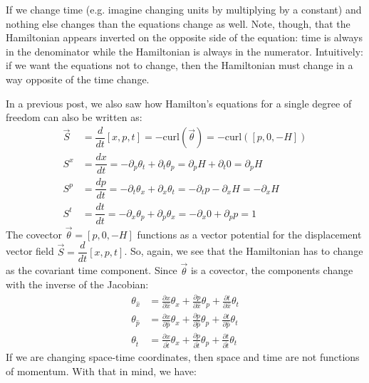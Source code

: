 \documentclass[aps,pra,10pt,floatfix,nofootinbib]{revtex4-1}
\theoremstyle{definition}
\begin{document}
If we change time (e.g. imagine changing units by multiplying by a constant) and nothing else changes than the equations change as well. Note, though, that the Hamiltonian appears inverted on the opposite side of the equation: time is always in the denominator while the Hamiltonian is always in the numerator. Intuitively: if we want the equations not to change, then the Hamiltonian must change in a way opposite of the time change.

In a previous post, we also saw how Hamilton's equations for a single degree of freedom can also be written as:
\begin{equation}
\begin{aligned}
\vec{S} &= \dfrac{d}{dt} [x, p, t] =  - \mathrm{curl}(\vec{\theta}) = - \mathrm{curl}([p, 0, -H]) \\
S^x &= \dfrac{dx}{dt} = - \partial_p \theta_t + \partial_t \theta_p = \partial_p H + \partial_t 0 = \partial_p H \\
S^p &= \dfrac{dp}{dt} = - \partial_t \theta_x + \partial_x \theta_t = -\partial_t p - \partial_x H = - \partial_x H \\
S^t &= \dfrac{dt}{dt} = - \partial_x \theta_p + \partial_p \theta_x = - \partial_x 0 + \partial_p p = 1
\end{aligned}
\label{HamiltonEquations}
\end{equation}
The covector $\vec{\theta}=[p, 0, -H]$ functions as a vector potential for the displacement vector field $\vec{S} = \dfrac{d}{dt} [x, p, t]$. So, again, we see that the Hamiltonian has to change as the covariant time component. Since $\vec{\theta}$ is a covector, the components change with the inverse of the Jacobian:
\begin{equation}
\begin{aligned}
\theta_{\hat{x}} &= \frac{\partial x}{\partial \hat{x}}\theta_x + \frac{\partial p}{\partial \hat{x}}\theta_p + \frac{\partial t}{\partial \hat{x}}\theta_t \\
\theta_{\hat{p}} &= \frac{\partial x}{\partial \hat{p}}\theta_x + \frac{\partial p}{\partial \hat{p}}\theta_p + \frac{\partial t}{\partial \hat{p}}\theta_t \\
\theta_{\hat{t}} &= \frac{\partial x}{\partial \hat{t}}\theta_x + \frac{\partial p}{\partial \hat{t}}\theta_p + \frac{\partial t}{\partial \hat{t}}\theta_t
\end{aligned}
\label{generalTransf}
\end{equation}
If we are changing space-time coordinates, then space and time are not functions of momentum. With that in mind, we have:
\end{document}
